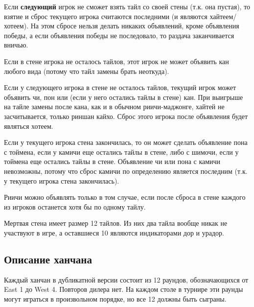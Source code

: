 \begin{additional}
\vspace{0.3cm}

Если \textbf{следующий} игрок не сможет взять тайл со своей стены (т.к. она пустая), то взятие и сброс текущего игрока считаются последними (и являются хайтеем/хотеем). На этом сбросе нельзя делать никаких объявлений, кроме объявления победы, а если объявления победы не последовало, то раздача заканчивается вничью.

\vspace{0.3cm}

Если в стене игрока не осталось тайлов, этот игрок не может объявить кан любого вида (потому что тайл замены брать неоткуда).

\vspace{0.3cm}

Если у следующего игрока в стене не осталось тайлов, текущий игрок может объявить чи, пон или (если у него остались тайлы в стене) кан. При выигрыше на тайле замены после кана, как и в обычном риичи-маджонге, хайтей не засчитывается, только риншан кайхо. Сброс этого игрока после объявления будет являться хотеем.

\vspace{0.3cm}

Если у текущего игрока стена закончилась, то он может сделать объявление пона с тоймена, если у камичи еще остались тайлы в стене, либо с шимочи, если у тоймена еще остались тайлы в стене. Объявление чи или пона с камичи невозможны, потому что сброс камичи по определению является последним (т.к. у текущего игрока стена закончилась).

\vspace{0.3cm}

Риичи можно объявлять только в том случае, если после сброса в стене каждого из игроков останется хотя бы по одному тайлу.

\vspace{0.3cm}

Мертвая стена имеет размер 12 тайлов. Из них два тайла вообще никак не участвуют в игре, а оставшиеся 10 являются индикаторами дор и урадор.

\subsection{Описание ханчана}

Каждый ханчан в дубликатной версии состоит из 12 раундов, обозначающихся от East 1 до West 4. Повторов дилера нет. На каждом столе в турнире эти раунды могут играться в произвольном порядке, но все 12 должны быть сыграны.


\end{additional}
